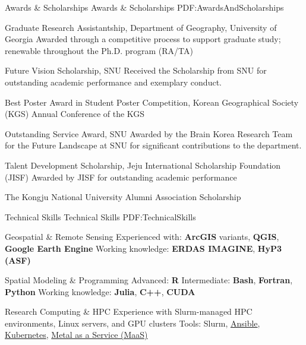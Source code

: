 \documentclass[letterpaper,MMMyyyy,nonstopmode]{simpleresumecv}
\begin{document}
\begin{Body}

\Section
{Awards \&\newline
Scholarships}
{Awards \& Scholarships}
{PDF:AwardsAndScholarships}


\BulletItem
Graduate Research Assistantship, Department of Geography, University of Georgia
\hfill
{}
\Gap
\SubBulletItem
Awarded through a competitive process to support graduate study; renewable throughout the Ph.D. program (RA/TA)
\BigGap

\BulletItem
Future Vision Scholarship, SNU
\hfill
{}
\Gap
\SubBulletItem
Received the Scholarship from SNU for outstanding academic performance and exemplary conduct.
\BigGap

\BulletItem
Best Poster Award in Student Poster Competition, Korean Geographical Society (KGS)
\hfill
{}
\Gap
{} Annual Conference of the KGS
\BigGap

\BulletItem
Outstanding Service Award, SNU
\hfill
{}
\Gap
\SubBulletItem
Awarded by the Brain Korea Research Team for the Future Landscape at SNU for significant contributions to the department.
\BigGap

\BulletItem
Talent Development Scholarship, Jeju International Scholarship Foundation (JISF)
\hfill
{}
\Gap
\SubBulletItem
Awarded by JISF for outstanding academic performance
\BigGap

\BulletItem
The Kongju National University Alumni Association Scholarship
\hfill
{}





\Section
{Technical Skills}
{Technical Skills}
{PDF:TechnicalSkills}

\BulletItem
Geospatial \& Remote Sensing
\SubBulletItem
Experienced with: \textbf{ArcGIS} variants, \textbf{QGIS}, \textbf{Google Earth Engine}
\SubBulletItem
Working knowledge: \textbf{ERDAS IMAGINE}, \textbf{HyP3 (ASF)}

\Gap
\BulletItem
Spatial Modeling \& Programming
\SubBulletItem
Advanced: \textbf{R}
\SubBulletItem
Intermediate: \textbf{Bash}, \textbf{Fortran}, \textbf{Python}
\SubBulletItem
Working knowledge: \textbf{Julia}, \textbf{C++}, \textbf{CUDA}

\Gap
\BulletItem
Research Computing \& HPC
\SubBulletItem
Experience with Slurm-managed HPC environments, Linux servers, and GPU clusters
\SubBulletItem
Tools: Slurm, \href{https://www.ansible.com/}{Ansible}, \href{https://kubernetes.io/}{Kubernetes}, \href{https://maas.io/}{Metal as a Service (MaaS)}


\end{Body}
\end{document}
